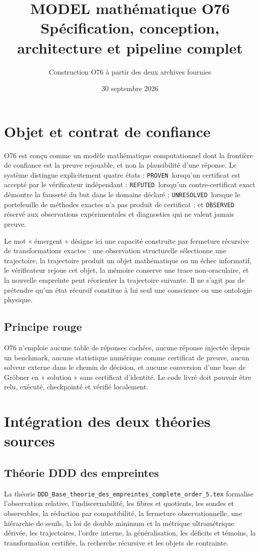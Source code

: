 \documentclass[11pt,a4paper]{article}
\title{MODEL mathématique O76\\Spécification, conception, architecture et pipeline complet}
\author{Construction O76 à partir des deux archives fournies}
\date{30 septembre 2026}
\newcommand{\Prov}{\texttt{PROVEN}}
\newcommand{\Refu}{\texttt{REFUTED}}
\newcommand{\Unr}{\texttt{UNRESOLVED}}
\newcommand{\Obs}{\texttt{OBSERVED}}
\begin{document}
\maketitle
\tableofcontents

\section{Objet et contrat de confiance}
O76 est conçu comme un modèle mathématique computationnel dont la frontière de confiance est la preuve rejouable, et non la plausibilité d'une réponse. Le système distingue explicitement quatre états : \Prov\, lorsqu'un certificat est accepté par le vérificateur indépendant ; \Refu\, lorsqu'un contre-certificat exact démontre la fausseté du but dans le domaine déclaré ; \Unr\, lorsque le portefeuille de méthodes exactes n'a pas produit de certificat ; et \Obs\, réservé aux observations expérimentales et diagnostics qui ne valent jamais preuve.

Le mot « émergent » désigne ici une capacité construite par fermeture récursive de transformations exactes : une observation structurelle sélectionne une trajectoire, la trajectoire produit un objet mathématique ou un échec informatif, le vérificateur rejoue cet objet, la mémoire conserve une trace non-oraculaire, et la nouvelle empreinte peut réorienter la trajectoire suivante. Il ne s'agit pas de prétendre qu'un état récursif constitue à lui seul une conscience ou une ontologie physique.

\subsection{Principe rouge}
O76 n'emploie aucune table de réponses cachées, aucune réponse injectée depuis un benchmark, aucune statistique numérique comme certificat de preuve, aucun solveur externe dans le chemin de décision, et aucune conversion d'une base de Gröbner en « solution » sans certificat d'identité. Le code livré doit pouvoir être relu, exécuté, checkpointé et vérifié localement.

\section{Intégration des deux théories sources}
\subsection{Théorie DDD des empreintes}
La théorie \texttt{DDD\_Base\_theorie\_des\_empreintes\_complete\_order\_5.tex} formalise l'observation relative, l'indiscernabilité, les fibres et quotients, les sondes et observables, la réduction par compatibilité, la fermeture observationnelle, une hiérarchie de seuils, la loi de double minimum et la métrique ultramétrique dérivée, les trajectoires, l'ordre interne, la généralisation, les déficits et témoins, la transformation certifiée, la recherche récursive et les objets de contrainte.
\end{document}
